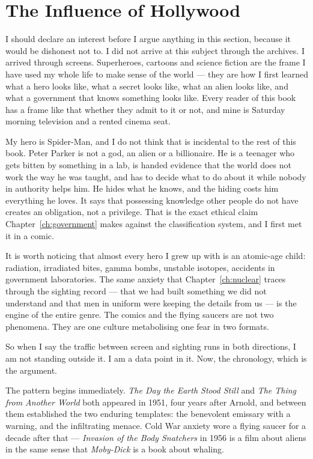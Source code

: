 \section{The Influence of Hollywood}\label{sec:influencehollywood}

I should declare an interest before I argue anything in this section, because it would be dishonest
not to. I did not arrive at this subject through the archives. I arrived through screens. Superheroes,
cartoons and science fiction are the frame I have used my whole life to make sense of the world ---
they are how I first learned what a hero looks like, what a secret looks like, what an alien looks
like, and what a government that knows something looks like. Every reader of this book has a
frame like that whether they admit to it or not, and mine is Saturday morning television and a
rented cinema seat.

My hero is Spider-Man, and I do not think that is incidental to the rest of this book. Peter Parker
is not a god, an alien or a billionaire. He is a teenager who gets bitten by something in a lab, is
handed evidence that the world does not work the way he was taught, and has to decide what to do
about it while nobody in authority helps him. He hides what he knows, and the hiding costs him
everything he loves.  It says that possessing knowledge
other people do not have creates an obligation, not a privilege. That is the exact ethical claim
Chapter~\ref{ch:government} makes against the classification system, and I first met it in a comic.

It is worth noticing that almost every hero I grew up with is an atomic-age child: radiation,
irradiated bites, gamma bombs, unstable isotopes, accidents in government laboratories. The same
anxiety that Chapter~\ref{ch:nuclear} traces through the sighting record --- that we had built
something we did not understand and that men in uniform were keeping the details from us --- is the
engine of the entire genre. The comics and the flying saucers are not two phenomena. They are one
culture metabolising one fear in two formats.

So when I say the traffic between screen and sighting runs in both directions, I am not standing
outside it. I am a data point in it. Now, the chronology, which is the argument.

The pattern begins immediately. \emph{The Day the Earth Stood Still} and \emph{The Thing from Another
World} both appeared in 1951, four years after Arnold, and between them established the two enduring
templates: the benevolent emissary with a warning, and the infiltrating menace. Cold War anxiety wore
a flying saucer for a decade after that --- \emph{Invasion of the Body Snatchers} in 1956 is a film
about aliens in the same sense that \emph{Moby-Dick} is a book about whaling.

